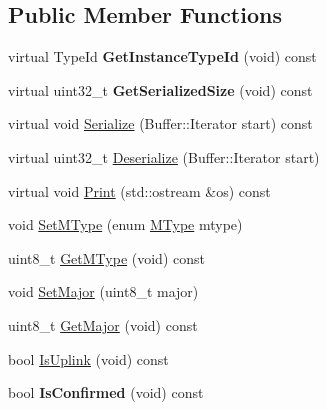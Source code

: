 \subsection*{Public Member Functions}
\begin{DoxyCompactItemize}
\item 
\mbox{\label{classns3_1_1lorawan_1_1LoraMacHeader_af640e50767cb91d3f4b721fadab55c7d}} 
virtual Type\+Id {\bfseries Get\+Instance\+Type\+Id} (void) const
\item 
\mbox{\label{classns3_1_1lorawan_1_1LoraMacHeader_ab76638affe606b6ef6dc1096eefcafd6}} 
virtual uint32\+\_\+t {\bfseries Get\+Serialized\+Size} (void) const
\item 
virtual void \hyperlink{classns3_1_1lorawan_1_1LoraMacHeader_ab0e2728e723f7ef538b9c8166a58aeae}{Serialize} (Buffer\+::\+Iterator start) const
\item 
virtual uint32\+\_\+t \hyperlink{classns3_1_1lorawan_1_1LoraMacHeader_a76306a0ee9aec0f81f1655a16af3c273}{Deserialize} (Buffer\+::\+Iterator start)
\item 
virtual void \hyperlink{classns3_1_1lorawan_1_1LoraMacHeader_a848844d4bdf4c6978b3ee71f4189d917}{Print} (std\+::ostream \&os) const
\item 
void \hyperlink{classns3_1_1lorawan_1_1LoraMacHeader_a5940848a7eee76b4a55fa19b380a5862}{Set\+M\+Type} (enum \hyperlink{classns3_1_1lorawan_1_1LoraMacHeader_afd050ac67eab24871452323799e07e94}{M\+Type} mtype)
\item 
uint8\+\_\+t \hyperlink{classns3_1_1lorawan_1_1LoraMacHeader_abe8c53eac32c0361756df3d798f70617}{Get\+M\+Type} (void) const
\item 
void \hyperlink{classns3_1_1lorawan_1_1LoraMacHeader_a4ea1b076a246aa8cc789aed92886b653}{Set\+Major} (uint8\+\_\+t major)
\item 
uint8\+\_\+t \hyperlink{classns3_1_1lorawan_1_1LoraMacHeader_a1084c40b7386db84e8c184732cd3f780}{Get\+Major} (void) const
\item 
bool \hyperlink{classns3_1_1lorawan_1_1LoraMacHeader_ac17b48b875ac5ed15ee7a863660cfa85}{Is\+Uplink} (void) const
\item 
\mbox{\label{classns3_1_1lorawan_1_1LoraMacHeader_a4d53065a1cd1a9b622f0f7e58d39d1c7}} 
bool {\bfseries Is\+Confirmed} (void) const
\end{DoxyCompactItemize}
